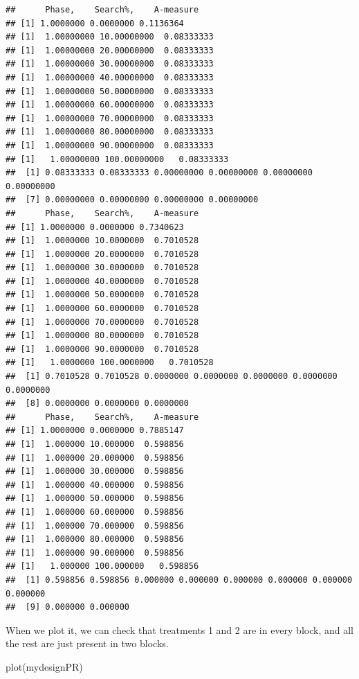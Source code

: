 \documentclass[
]{book}
\newenvironment{Shaded}{\begin{snugshade}}{\end{snugshade}}
\newcommand{\FunctionTok}[1]{\textcolor[rgb]{0.00,0.00,0.00}{#1}}
\newcommand{\NormalTok}[1]{#1}
\begin{document}
\begin{verbatim}
##      Phase,    Search%,    A-measure
## [1] 1.0000000 0.0000000 0.1136364
## [1]  1.00000000 10.00000000  0.08333333
## [1]  1.00000000 20.00000000  0.08333333
## [1]  1.00000000 30.00000000  0.08333333
## [1]  1.00000000 40.00000000  0.08333333
## [1]  1.00000000 50.00000000  0.08333333
## [1]  1.00000000 60.00000000  0.08333333
## [1]  1.00000000 70.00000000  0.08333333
## [1]  1.00000000 80.00000000  0.08333333
## [1]  1.00000000 90.00000000  0.08333333
## [1]   1.00000000 100.00000000   0.08333333
##  [1] 0.08333333 0.08333333 0.00000000 0.00000000 0.00000000 0.00000000
##  [7] 0.00000000 0.00000000 0.00000000 0.00000000
##      Phase,    Search%,    A-measure
## [1] 1.0000000 0.0000000 0.7340623
## [1]  1.0000000 10.0000000  0.7010528
## [1]  1.0000000 20.0000000  0.7010528
## [1]  1.0000000 30.0000000  0.7010528
## [1]  1.0000000 40.0000000  0.7010528
## [1]  1.0000000 50.0000000  0.7010528
## [1]  1.0000000 60.0000000  0.7010528
## [1]  1.0000000 70.0000000  0.7010528
## [1]  1.0000000 80.0000000  0.7010528
## [1]  1.0000000 90.0000000  0.7010528
## [1]   1.0000000 100.0000000   0.7010528
##  [1] 0.7010528 0.7010528 0.0000000 0.0000000 0.0000000 0.0000000 0.0000000
##  [8] 0.0000000 0.0000000 0.0000000
##      Phase,    Search%,    A-measure
## [1] 1.0000000 0.0000000 0.7885147
## [1]  1.000000 10.000000  0.598856
## [1]  1.000000 20.000000  0.598856
## [1]  1.000000 30.000000  0.598856
## [1]  1.000000 40.000000  0.598856
## [1]  1.000000 50.000000  0.598856
## [1]  1.000000 60.000000  0.598856
## [1]  1.000000 70.000000  0.598856
## [1]  1.000000 80.000000  0.598856
## [1]  1.000000 90.000000  0.598856
## [1]   1.000000 100.000000   0.598856
##  [1] 0.598856 0.598856 0.000000 0.000000 0.000000 0.000000 0.000000 0.000000
##  [9] 0.000000 0.000000
\end{verbatim}

When we plot it, we can check that treatments 1 and 2 are in every block, and all the rest are just present in two blocks.

\begin{Shaded}
\begin{Highlighting}[]
\FunctionTok{plot}\NormalTok{(mydesignPR) }
\end{Highlighting}
\end{Shaded}
\end{document}
